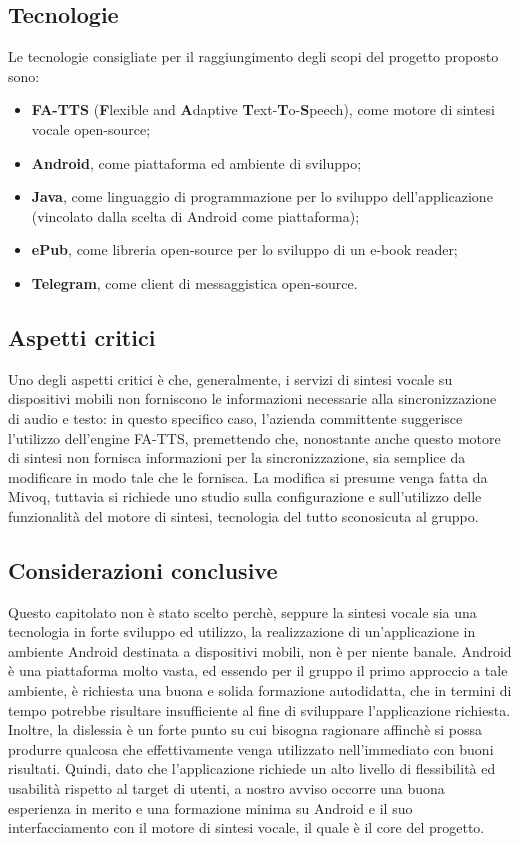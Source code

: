 \subsection{Tecnologie}

Le tecnologie consigliate per il raggiungimento degli scopi del progetto
proposto sono:
\begin{itemize}
	\item \textbf{FA-TTS} (\textbf{F}lexible and \textbf{A}daptive \textbf{T}ext-\textbf{T}o-\textbf{S}peech),
	come motore di sintesi vocale open-source;
	\item \textbf{Android}, come piattaforma ed ambiente di sviluppo;
	\item \textbf{Java}, come linguaggio di programmazione per lo sviluppo dell'applicazione
	(vincolato dalla scelta di Android come piattaforma);
	\item \textbf{ePub}, come libreria open-source per lo sviluppo di un e-book
	reader;
	\item \textbf{Telegram}, come client di messaggistica open-source.
\end{itemize}

\subsection{Aspetti critici}

Uno degli aspetti critici è che, generalmente, i servizi di sintesi
vocale su dispositivi mobili non forniscono le informazioni necessarie
alla sincronizzazione di audio e testo: in questo specifico caso,
l'azienda committente suggerisce l'utilizzo dell'engine FA-TTS,
premettendo che, nonostante anche questo motore di sintesi non fornisca
informazioni per la sincronizzazione, sia semplice da modificare in
modo tale che le fornisca. La modifica si presume venga fatta da Mivoq,
tuttavia si richiede uno studio sulla configurazione e sull'utilizzo
delle funzionalità del motore di sintesi, tecnologia del tutto sconosicuta al gruppo. 

\subsection{Considerazioni conclusive}

Questo capitolato non è stato scelto perchè, seppure
la sintesi vocale sia una tecnologia in forte sviluppo ed utilizzo,
la realizzazione di un'applicazione in ambiente Android destinata
a dispositivi mobili, non è per niente banale. Android è una piattaforma
molto vasta, ed essendo per il gruppo il primo approccio a tale ambiente,
è richiesta una buona e solida formazione autodidatta, che in termini
di tempo potrebbe risultare insufficiente al fine di sviluppare l'applicazione
richiesta. Inoltre, la dislessia è un forte punto su cui bisogna ragionare
affinchè si possa produrre qualcosa che effettivamente venga utilizzato
nell'immediato con buoni risultati. Quindi, dato che l'applicazione
richiede un alto livello di flessibilità ed usabilità rispetto al
target di utenti, a nostro avviso occorre una buona esperienza in
merito e una formazione minima su Android e il suo interfacciamento
con il motore di sintesi vocale, il quale è il core del progetto.